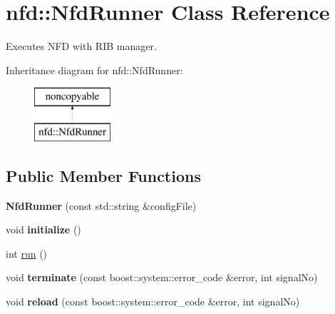 \hypertarget{classnfd_1_1NfdRunner}{}\section{nfd\+:\+:Nfd\+Runner Class Reference}
\label{classnfd_1_1NfdRunner}


Executes N\+FD with R\+IB manager.  


Inheritance diagram for nfd\+:\+:Nfd\+Runner\+:\begin{figure}[H]
\begin{center}
\leavevmode
\includegraphics[height=2.000000cm]{classnfd_1_1NfdRunner}
\end{center}
\end{figure}
\subsection*{Public Member Functions}
\begin{DoxyCompactItemize}
\item 
{\bfseries Nfd\+Runner} (const std\+::string \&config\+File)\hypertarget{classnfd_1_1NfdRunner_a861815c3a0f525bf7c2109182e7fd355}{}\label{classnfd_1_1NfdRunner_a861815c3a0f525bf7c2109182e7fd355}

\item 
void {\bfseries initialize} ()\hypertarget{classnfd_1_1NfdRunner_a4993cd67ab3bd8da122f33a75af092f7}{}\label{classnfd_1_1NfdRunner_a4993cd67ab3bd8da122f33a75af092f7}

\item 
int \hyperlink{classnfd_1_1NfdRunner_abcfea6dbe65a6845406989977465fb67}{run} ()
\item 
void {\bfseries terminate} (const boost\+::system\+::error\+\_\+code \&error, int signal\+No)\hypertarget{classnfd_1_1NfdRunner_aa790abc2b09a108859ee339093ba2d85}{}\label{classnfd_1_1NfdRunner_aa790abc2b09a108859ee339093ba2d85}

\item 
void {\bfseries reload} (const boost\+::system\+::error\+\_\+code \&error, int signal\+No)\hypertarget{classnfd_1_1NfdRunner_a24f43496f215c2a9ce630172d7e9858d}{}\label{classnfd_1_1NfdRunner_a24f43496f215c2a9ce630172d7e9858d}

\end{DoxyCompactItemize}
